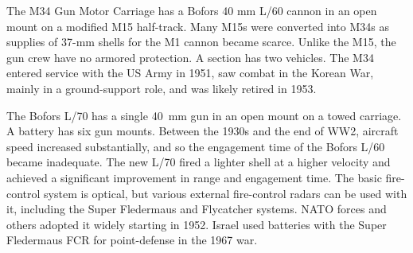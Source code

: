 \begin{withcounters}

    The M34 Gun Motor Carriage has a Bofors 40 mm L/60 cannon in an open mount on a modified M15 half-track.
    Many M15s were converted into M34s as supplies of 37-mm shells for the M1 cannon became scarce. Unlike the M15, the gun crew have no armored protection.
    A section has two vehicles.
    The M34 entered service with the US Army in 1951, saw combat in the Korean War, mainly in a ground-support role, and was likely retired in 1953.%


    The Bofors L/70 has a single 40~mm gun in an open mount on a towed carriage.
    A battery has six gun mounts.
    Between the 1930s and the end of WW2, aircraft speed increased substantially, and so the engagement time of the Bofors L/60 became inadequate. The new L/70 fired a lighter shell at a higher velocity and achieved a significant improvement in range and engagement time. The basic fire-control system is optical, but various external fire-control radars can be used with it, including the Super Fledermaus and Flycatcher systems.
    NATO forces and others adopted it widely starting in 1952. Israel used batteries with the Super Fledermaus FCR for point-defense in the 1967 war.%
\end{withcounters}
